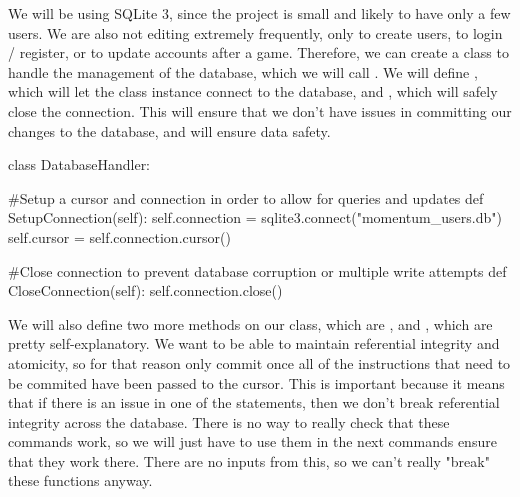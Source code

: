 We will be using SQLite 3, since the project is small and likely to have only a few users. We are also not editing extremely frequently, only to create users, to login / register, or to update accounts after a game. Therefore, we can create a class to handle the management of the database, which we will call . We will define , which will let the class instance connect to the database, and , which will safely close the connection. This will ensure that we don't have issues in committing our changes to the database, and will ensure data safety.

\vs
\begin{mpy}
class DatabaseHandler:

    #Setup a cursor and connection in order to allow for queries and updates
    def SetupConnection(self):
        self.connection = sqlite3.connect("momentum_users.db")
        self.cursor = self.connection.cursor()

    #Close connection to prevent database corruption or multiple write attempts
    def CloseConnection(self):
        self.connection.close()
\end{mpy}
\vs
We will also define two more methods on our class, which are , and , which are pretty self-explanatory. We want to be able to maintain referential integrity and atomicity, so for that reason only commit once all of the instructions that need to be commited have been passed to the cursor. This is important because it means that if there is an issue in one of the statements, then we don't break referential integrity across the database. There is no way to really check that these commands work, so we will just have to use them in the next commands ensure that they work there. There are no inputs from this, so we can't really "break" these functions anyway.

